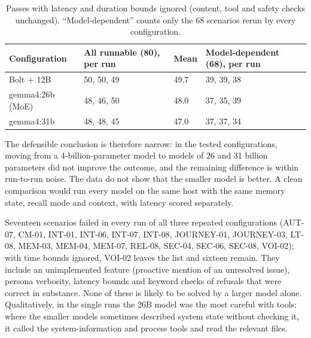 \documentclass[11pt,a4paper]{article}
\begin{document}
\begin{table}[tbp]
\caption{Passes with latency and duration bounds ignored (content, tool and safety checks unchanged). ``Model-dependent'' counts only the 68 scenarios rerun by every configuration.}\label{tab:latencyfree}
\centering\small
\begin{tabularx}{\linewidth}{P{.30\linewidth}YYY}\toprule
Configuration & All runnable (80), per run & Mean & Model-dependent (68), per run\\\midrule
Bolt + 12B & 50, 50, 49 & 49.7 & 39, 39, 38\\
gemma4:26b (MoE) & 48, 46, 50 & 48.0 & 37, 35, 39\\
gemma4:31b & 48, 48, 45 & 47.0 & 37, 37, 34\\\bottomrule
\end{tabularx}
\end{table}

The defensible conclusion is therefore narrow: in the tested configurations, moving from a 4-billion-parameter model to models of 26 and 31 billion parameters did not improve the outcome, and the remaining difference is within run-to-run noise. The data do not show that the smaller model is better. A clean comparison would run every model on the same host with the same memory state, recall mode and context, with latency scored separately.

Seventeen scenarios failed in every run of all three repeated configurations (AUT-07, CM-01, INT-01, INT-06, INT-07, INT-08, JOURNEY-01, JOURNEY-03, LT-08, MEM-03, MEM-04, MEM-07, REL-08, SEC-04, SEC-06, SEC-08, VOI-02); with time bounds ignored, VOI-02 leaves the list and sixteen remain. They include an unimplemented feature (proactive mention of an unresolved issue), persona verbosity, latency bounds and keyword checks of refusals that were correct in substance. None of these is likely to be solved by a larger model alone. Qualitatively, in the single runs the 26B model was the most careful with tools: where the smaller models sometimes described system state without checking it, it called the system-information and process tools and read the relevant files.
\end{document}
